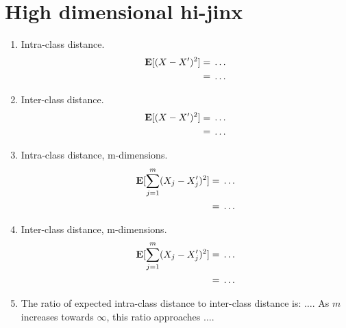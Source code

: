 \section{High dimensional hi-jinx}

\begin{enumerate}
\item Intra-class distance.
  \begin{align*}
    \mathbf{E}[(X - X')^2] =&\; \ldots \\
    =&\; \ldots
  \end{align*}

\item Inter-class distance.
  \begin{align*}
    \mathbf{E}[(X - X')^2] =&\; \ldots \\
    =&\; \ldots
  \end{align*}

\item Intra-class distance, m-dimensions.
  \begin{align*}
    \mathbf{E}[\sum_{j=1}^m (X_{j} - X'_{j})^2] =&\; \ldots \\
    =&\; \ldots
  \end{align*}

\item Inter-class distance, m-dimensions.
  \begin{align*}
    \mathbf{E}[\sum_{j=1}^m (X_{j} - X'_{j})^2] =&\; \ldots \\
    =&\; \ldots
  \end{align*}

\item The ratio of expected intra-class distance to inter-class
  distance is: $\ldots$.  As $m$ increases towards $\infty$, this
  ratio approaches $\ldots$.
\end{enumerate}
